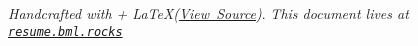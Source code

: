\documentclass[line,margin]{res}
\begin{document}
\begin{resume}
\end{resume}

\vfill
\textit{Handcrafted with \heartsuit + \LaTeX (\href{https://github.com/Cheezmeister/resume/raw/master/b_luchen_resume.tex}{View\ Source})}.
\hfill
\textit{This document lives at \texttt{\href{http://resume.bml.rocks}{resume.bml.rocks}}}
\\
\end{document}
